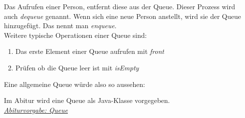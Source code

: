 \begin{flushleft}
    Das Aufrufen einer Person, entfernt diese aus der Queue.
    Dieser Prozess wird auch \textit{dequeue} genannt.
    Wenn sich eine neue Person anstellt, wird sie der Queue hinzugefügt.
    Das nennt man \textit{enqueue}. \\
    Weitere typische Operationen einer Queue sind:
    \begin{enumerate}
        \item {
                Das erste Element einer Queue aufrufen mit \textit{front}
            }
        \item {
                Prüfen ob die Queue leer ist mit \textit{isEmpty}
            }
    \end{enumerate}
    Eine allgemeine Queue würde also so aussehen:
\end{flushleft}

\begin{center}
\end{center}

\begin{flushleft}
    Im Abitur wird eine Queue als Java-Klasse vorgegeben. \\
    \href{https://raw.githubusercontent.com/tim-tm/informatik-notes/main/code/Queue.java}{\textit{Abiturvorgabe: Queue}}
\end{flushleft}

